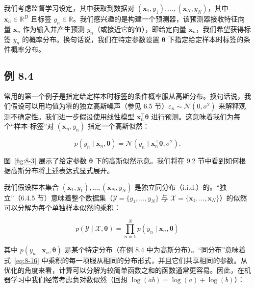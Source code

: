 我们考虑监督学习设定，其中获取到数据对 $ (\boldsymbol{x}_1, y_1), \ldots, (\boldsymbol{x}_N, y_N) $，其中 $ \boldsymbol{x}_n \in \mathbb{R}^D $ 且标签 $ y_n \in \mathbb{R} $。我们感兴趣的是构建一个预测器，该预测器接收特征向量 $ \boldsymbol{x}_n $ 作为输入并产生预测 $ y_n $（或接近它的值），即给定向量 $ \boldsymbol{x}_n $，我们希望获得标签 $ y_n $ 的概率分布。换句话说，我们在特定参数设置 $ \boldsymbol{\theta} $ 下指定给定样本时标签的条件概率分布。

\subsection*{例 8.4}

常用的第一个例子是指定给定样本时标签的条件概率服从高斯分布。换句话说，我们假设可以用均值为零的独立高斯噪声（参见 6.5 节）$ \varepsilon_n \sim \mathcal{N}(0, \sigma^2) $ 来解释观测不确定性。我们进一步假设使用线性模型 $ \boldsymbol{x}_n^\top \boldsymbol{\theta} $ 进行预测。这意味着我们为每个“样本-标签”对 $ (\boldsymbol{x}_n, y_n) $ 指定一个高斯似然：

\begin{equation}
p(y_n \mid \boldsymbol{x}_n, \boldsymbol{\theta}) = \mathcal{N}\left(y_n \mid \boldsymbol{x}_n^\top \boldsymbol{\theta}, \sigma^2\right) .
\tag{8.15}\label{eq:8-15}
\end{equation}

图~\ref{fig:8-3} 展示了给定参数 $ \boldsymbol{\theta} $ 下的高斯似然示意。我们将在 9.2 节中看到如何根据高斯分布将上述表达式显式展开。

我们假设样本集合 $ (\boldsymbol{x}_1, y_1), \ldots, (\boldsymbol{x}_N, y_N) $ 是独立同分布（i.i.d.）的。“独立”（6.4.5 节）意味着整个数据集（$ \mathcal{Y} = \{y_1, \ldots, y_N\} $ 与 $ \mathcal{X} = \{\boldsymbol{x}_1, \ldots, \boldsymbol{x}_N\} $）的似然可以分解为每个单独样本似然的乘积：

\begin{equation}
p(\mathcal{Y} \mid \mathcal{X}, \boldsymbol{\theta}) = \prod_{n=1}^N p(y_n \mid \boldsymbol{x}_n, \boldsymbol{\theta})
\tag{8.16}\label{eq:8-16}
\end{equation}

其中 $ p(y_n \mid \boldsymbol{x}_n, \boldsymbol{\theta}) $ 是某个特定分布（在例 8.4 中为高斯分布）。“同分布”意味着式~\eqref{eq:8-16} 中乘积的每一项服从相同的分布形式，并且它们共享相同的参数。从优化的角度来看，计算可以分解为较简单函数之和的函数通常更容易。因此，在机器学习中我们经常考虑负对数似然（回想 $ \log(ab) = \log(a) + \log(b) $）：


